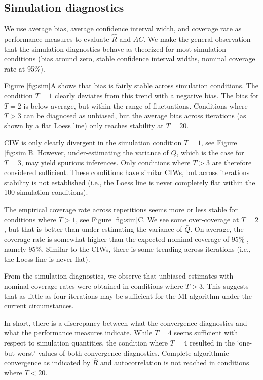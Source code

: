 \documentclass[article]{jss}
\begin{document}
\subsection{Simulation diagnostics}

We use average bias, average confidence interval width, and coverage rate as performance measures to evaluate $\widehat{R}$ and $AC$. We make the general observation that the simulation diagnostics behave as theorized for most simulation conditions (bias around zero, stable confidence interval widths, nominal coverage rate at 95\%). 

Figure \ref{fig:sim}A shows that bias is fairly stable across simulation conditions. The condition $T=1$ clearly deviates from this trend with a negative bias. The bias for $T=2$ is below average, but within the range of fluctuations. Conditions where $T>3$ can be diagnosed as unbiased, but the average bias across iterations (as shown by a flat Loess line) only reaches stability at $T=20$. 

CIW is only clearly divergent in the simulation condition $T=1$, see Figure \ref{fig:sim}B. However, under-estimating the variance of $\bar{Q}$, which is the case for $T=3$, may yield spurious inferences. Only conditions where $T>3$ are therefore considered sufficient. These conditions have similar CIWs, but across iterations stability is not established (i.e., the Loess line is never completely flat within the 100 simulation conditions). %

The empirical coverage rate across repetitions seems more or less stable for conditions where $T>1$, see Figure \ref{fig:sim}C. We see some over-coverage at $T=2$, but that is better than under-estimating the variance of $\bar{Q}$. On average, the coverage rate is somewhat higher than the expected nominal coverage of 95\% \citep{neym34}, namely 95\%. Similar to the CIWs, there is some trending across iterations (i.e., the Loess line is never flat).

From the simulation diagnostics, we observe that unbiased estimates with nominal coverage rates were obtained in conditions where $T>3$. This suggests that as little as four iterations may be sufficient for the MI algorithm under the current circumstances.

In short, there is a discrepancy between what the convergence diagnostics and what the performance measures indicate. While $T=4$ seems sufficient with respect to simulation quantities, the condition where $T=4$ resulted in the `one-but-worst' values of both convergence diagnostics. Complete algorithmic convergence as indicated by $\widehat{R}$ and autocorrelation is not reached in conditions where $T<20$.  
\end{document}
